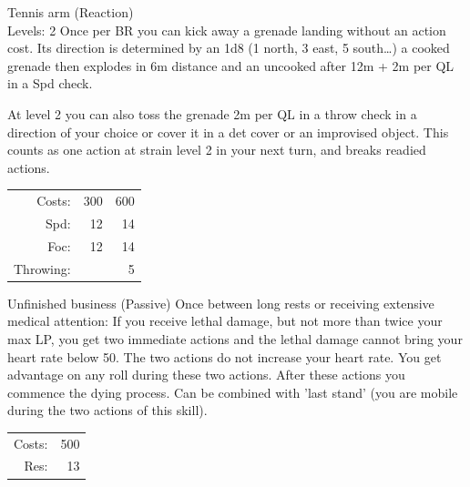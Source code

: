 \begin{skill}{Tennis arm (Reaction) \\\phantom{a}\hfill Levels: 2}
	\setlength{\parskip}{8pt}
	\setlength{\parindent}{0pt}
	Once per BR you can kick away a grenade landing without an action cost. Its direction is determined by an 1d8 (1 north, 3 east, 5 south…) a cooked grenade then explodes in 6m distance and an uncooked after 12m + 2m per QL in a Spd check.

	At level 2 you can also toss the grenade 2m per QL in a throw check in a direction of your choice or cover it in a det cover or an improvised object. This counts as one action at strain level 2 in your next turn, and breaks readied actions.\\

	\hfill
	\begin{tabular}{rrr}
		Costs: & 300 & 600 \\
		Spd: & 12 & 14 \\
		Foc: & 12 & 14 \\
		Throwing: &  & 5 \\
	\end{tabular}
\end{skill}

\begin{skill}{Unfinished business (Passive)}
	\setlength{\parskip}{8pt}
	\setlength{\parindent}{0pt}
	Once between long rests or receiving extensive medical attention: If you receive lethal damage, but not more than twice your max LP, you get two immediate actions and the lethal damage cannot bring your heart rate below 50. The two actions do not increase your heart rate. You get advantage on any roll during these two actions. After these actions you commence the dying process. Can be combined with 'last stand' (you are mobile during the two actions of this skill).\\

	\hfill
	\begin{tabular}{rr}
		Costs: & 500 \\
		Res: & 13 \\
	\end{tabular}
\end{skill}


